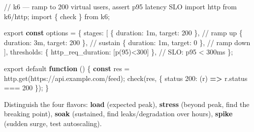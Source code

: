 \documentclass[11pt]{article}
\newenvironment{Shaded}{\begin{snugshade}}{\end{snugshade}}
\newcommand{\AttributeTok}[1]{\textcolor[rgb]{0.16,0.50,0.73}{#1}}
\newcommand{\CommentTok}[1]{\textcolor[rgb]{0.48,0.49,0.49}{#1}}
\newcommand{\DataTypeTok}[1]{\textcolor[rgb]{0.16,0.50,0.73}{#1}}
\newcommand{\DecValTok}[1]{\textcolor[rgb]{0.96,0.45,0.00}{#1}}
\newcommand{\FunctionTok}[1]{\textcolor[rgb]{0.56,0.27,0.68}{#1}}
\newcommand{\ImportTok}[1]{\textcolor[rgb]{0.15,0.68,0.38}{#1}}
\newcommand{\KeywordTok}[1]{\textcolor[rgb]{0.81,0.81,0.76}{\textbf{#1}}}
\newcommand{\NormalTok}[1]{\textcolor[rgb]{0.81,0.81,0.76}{#1}}
\newcommand{\OperatorTok}[1]{\textcolor[rgb]{0.81,0.81,0.76}{#1}}
\newcommand{\StringTok}[1]{\textcolor[rgb]{0.96,0.31,0.31}{#1}}
\begin{document}

\begin{Shaded}
\begin{Highlighting}[]
\CommentTok{// k6 — ramp to 200 virtual users, assert p95 latency SLO}
\ImportTok{import}\NormalTok{ http }\ImportTok{from} \StringTok{\textquotesingle{}k6/http\textquotesingle{}}\OperatorTok{;}
\ImportTok{import}\NormalTok{ \{ check \} }\ImportTok{from} \StringTok{\textquotesingle{}k6\textquotesingle{}}\OperatorTok{;}

\ImportTok{export} \KeywordTok{const}\NormalTok{ options }\OperatorTok{=}\NormalTok{ \{}
  \DataTypeTok{stages}\OperatorTok{:}\NormalTok{ [}
\NormalTok{    \{ }\DataTypeTok{duration}\OperatorTok{:} \StringTok{\textquotesingle{}1m\textquotesingle{}}\OperatorTok{,} \DataTypeTok{target}\OperatorTok{:} \DecValTok{200}\NormalTok{ \}}\OperatorTok{,}   \CommentTok{// ramp up}
\NormalTok{    \{ }\DataTypeTok{duration}\OperatorTok{:} \StringTok{\textquotesingle{}3m\textquotesingle{}}\OperatorTok{,} \DataTypeTok{target}\OperatorTok{:} \DecValTok{200}\NormalTok{ \}}\OperatorTok{,}   \CommentTok{// sustain}
\NormalTok{    \{ }\DataTypeTok{duration}\OperatorTok{:} \StringTok{\textquotesingle{}1m\textquotesingle{}}\OperatorTok{,} \DataTypeTok{target}\OperatorTok{:} \DecValTok{0}\NormalTok{ \}}\OperatorTok{,}     \CommentTok{// ramp down}
\NormalTok{  ]}\OperatorTok{,}
  \DataTypeTok{thresholds}\OperatorTok{:}\NormalTok{ \{ }\DataTypeTok{http\_req\_duration}\OperatorTok{:}\NormalTok{ [}\StringTok{\textquotesingle{}p(95)\textless{}300\textquotesingle{}}\NormalTok{] \}}\OperatorTok{,}  \CommentTok{// SLO: p95 \textless{} 300ms}
\NormalTok{\}}\OperatorTok{;}

\ImportTok{export} \ImportTok{default} \KeywordTok{function}\NormalTok{ () \{}
  \KeywordTok{const}\NormalTok{ res }\OperatorTok{=}\NormalTok{ http}\OperatorTok{.}\FunctionTok{get}\NormalTok{(}\StringTok{\textquotesingle{}https://api.example.com/feed\textquotesingle{}}\NormalTok{)}\OperatorTok{;}
  \FunctionTok{check}\NormalTok{(res}\OperatorTok{,}\NormalTok{ \{ }\StringTok{\textquotesingle{}status 200\textquotesingle{}}\OperatorTok{:}\NormalTok{ (r) }\KeywordTok{=\textgreater{}}\NormalTok{ r}\OperatorTok{.}\AttributeTok{status} \OperatorTok{===} \DecValTok{200}\NormalTok{ \})}\OperatorTok{;}
\NormalTok{\}}
\end{Highlighting}
\end{Shaded}

Distinguish the four flavors: \textbf{load} (expected peak), \textbf{stress} (beyond peak, find the breaking point), \textbf{soak} (sustained, find leaks/degradation over hours), \textbf{spike} (sudden surge, test autoscaling).
\end{document}
